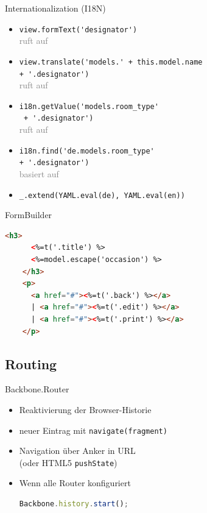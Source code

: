 \begin{frame}{Internationalization (I18N)}
  \begin{itemize}
    \item \lstinline[lang=JavaScript]-view.formText('designator')-\\
      \hfill\textcolor{gray}{ruft auf}\hfill\strut
    \item \lstinline[lang=JavaScript]-view.translate('models.' + this.model.name-\\
      \qquad  \lstinline[lang=JavaScript]-+ '.designator')-\\
      \hfill\textcolor{gray}{ruft auf}\hfill\strut
    \item \lstinline[lang=JavaScript]-i18n.getValue('models.room_type'-\\
      \qquad \lstinline[lang=JavaScript]- + '.designator')-\\
      \hfill\textcolor{gray}{ruft auf}\hfill\strut
    \item \lstinline[lang=JavaScript]-i18n.find('de.models.room_type'- \\
      \qquad \lstinline[lang=JavaScript]-+ '.designator')-\\
      \hfill\textcolor{gray}{basiert auf}\hfill\strut
    \item \lstinline[lang=JavaScript]-_.extend(YAML.eval(de), YAML.eval(en))-
  \end{itemize}
\end{frame}

\begin{frame}[fragile]{FormBuilder}
  \begin{lstlisting}[language=HTML,gobble=4]
    <h3>
      <%=t('.title') %>
      <%=model.escape('occasion') %>
    </h3>
    <p>
      <a href="#"><%=t('.back') %></a>
      | <a href="#"><%=t('.edit') %></a>
      | <a href="#"><%=t('.print') %></a>
    </p>
  \end{lstlisting}
\end{frame}

\subsection{Routing}

\begin{frame}[fragile]{Backbone.Router}
  \begin{itemize}
    \item Reaktivierung der Browser-Historie
    \item neuer Eintrag mit \lstinline-navigate(fragment)-
    \item Navigation über Anker in URL \\
      (oder HTML5 \lstinline-pushState-)
    \item Wenn alle Router konfiguriert \\
      \begin{lstlisting}[language=JavaScript,gobble=8]
        Backbone.history.start();
      \end{lstlisting}
  \end{itemize}
\end{frame}

